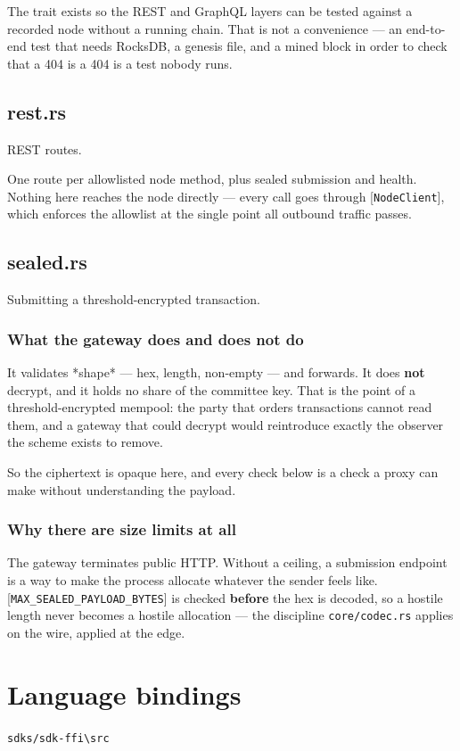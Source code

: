 \documentclass[11pt,a4paper]{article}
\begin{document}
The trait exists so the REST and GraphQL layers can be tested against a
recorded node without a running chain. That is not a convenience — an
end-to-end test that needs RocksDB, a genesis file, and a mined block in
order to check that a 404 is a 404 is a test nobody runs.

\subsection{rest.rs}
REST routes.

One route per allowlisted node method, plus sealed submission and health.
Nothing here reaches the node directly — every call goes through
[\texttt{NodeClient}], which enforces the allowlist at the single point all
outbound traffic passes.

\subsection{sealed.rs}
Submitting a threshold-encrypted transaction.

\subsubsection{What the gateway does and does not do}

It validates *shape* — hex, length, non-empty — and forwards. It does
\textbf{not} decrypt, and it holds no share of the committee key. That is the
point of a threshold-encrypted mempool: the party that orders transactions
cannot read them, and a gateway that could decrypt would reintroduce
exactly the observer the scheme exists to remove.

So the ciphertext is opaque here, and every check below is a check a proxy
can make without understanding the payload.

\subsubsection{Why there are size limits at all}

The gateway terminates public HTTP. Without a ceiling, a submission
endpoint is a way to make the process allocate whatever the sender feels
like. [\texttt{MAX\_SEALED\_PAYLOAD\_BYTES}] is checked \textbf{before} the hex is decoded,
so a hostile length never becomes a hostile allocation — the discipline
\texttt{core/codec.rs} applies on the wire, applied at the edge.

\section{Language bindings}
\noindent\texttt{sdks/sdk-ffi\textbackslash{}src}
\end{document}
